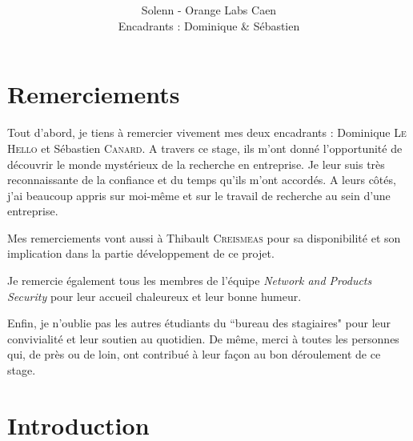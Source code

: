 \documentclass[11pt,oneside]{book}
\title {\bf\Huge\color{OrangeLogo}{Techniques d'anonymisation \\ des données}}
\author{Solenn \bsc{Brunet} - Orange Labs Caen \\ Encadrants : Dominique \bsc{Le Hello} \& Sébastien \bsc{Canard}}
\date{}
\begin{document}
	\frontmatter

	\begin{titlepage} %
		
	\end{titlepage}


	\chapter*{Remerciements} 
	
		Tout d'abord, je tiens à remercier vivement mes deux encadrants : Dominique \textsc{Le Hello} et  Sébastien \textsc{Canard}. A travers ce stage, ils m'ont donné l'opportunité de découvrir le monde mystérieux de la recherche en entreprise. Je leur suis très reconnaissante de la confiance et du temps qu'ils m'ont accordés. A leurs côtés, j'ai beaucoup appris sur moi-même et sur le travail de recherche au sein d'une entreprise.
	
	\medskip
	
	Mes remerciements vont aussi à Thibault \textsc{Creismeas} pour sa disponibilité et son implication dans la partie développement de ce projet.
	
	\medskip
	
	Je remercie également tous les membres de l'équipe \emph{Network and Products Security} pour leur accueil chaleureux et leur bonne humeur.
	
	\medskip
	
	Enfin, je n'oublie pas les autres étudiants du ``bureau des stagiaires" pour leur convivialité et leur soutien au quotidien. De même, merci à toutes les personnes qui, de près ou de loin, ont contribué à leur façon au bon déroulement de ce stage.
	

	
	\tableofcontents


	
	\chapter*{Introduction}
	
\end{document}
